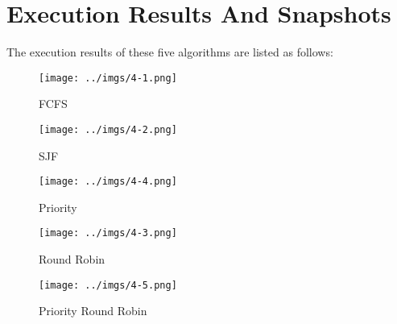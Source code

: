 \documentclass[12pt]{extarticle}
\newcommand{\<}{\langle}
\renewcommand{\>}{\rangle}
\theoremstyle{definition}
\begin{document}
	\section{Execution Results And Snapshots}
	The execution results of these five algorithms are listed as follows:
	\begin{figure}[H]
	\centering 
	\texttt{[image: ../imgs/4-1.png]}
	\caption{FCFS}
	\end{figure}
	\begin{figure}[H]
		\centering 
		\texttt{[image: ../imgs/4-2.png]}
		\caption{SJF}
	\end{figure}
	\begin{figure}[H]
		\centering 
		\texttt{[image: ../imgs/4-4.png]}
		\caption{Priority}
	\end{figure}
	\begin{figure}[H]
		\centering 
		\texttt{[image: ../imgs/4-3.png]}
		\caption{Round Robin}
	\end{figure}
	\begin{figure}[H]
		\centering 
		\texttt{[image: ../imgs/4-5.png]}
		\caption{Priority Round Robin}
	\end{figure}
	
\end{document}
